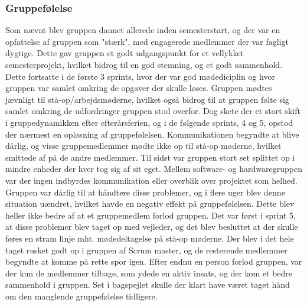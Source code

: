 \subsubsection{Gruppefølelse}
Som nævnt blev gruppen dannet allerede inden semesterstart, og der var en opfattelse af gruppen som "stærk", med engagerede medlemmer der var fagligt dygtige. 
Dette gav gruppen et godt udgangspunkt for et vellykket semesterprojekt, hvilket bidrog til en god stemning, og et godt sammenhold. Dette fortsatte i de første
 3 sprints, hvor der var god mødediciplin og hvor gruppen var samlet omkring de opgaver der skulle løses. Gruppen mødtes jævnligt til stå-op/arbejdsmøderne, 
 hvilket også bidrog til at gruppen følte sig samlet omkring de udfordringer gruppen stod overfor. Dog skete 
der et 
stort skift i gruppedynamikken efter efterårsferien, og i de følgende sprints, 4 og 5, opstod der nærmest en opløsning af gruppefølelsen. Kommunikationen 
begyndte at blive dårlig, og visse gruppemedlemmer mødte ikke op til stå-op møderne, hvilket smittede af på de andre medlemmer. Til sidst var gruppen stort 
set splittet op i mindre enheder der hver tog sig af sit eget. Mellem software- og hardwaregruppen var der ingen 
indbyrdes kommunikation eller overblik over projektet som helhed. Gruppen var dårlig til at håndtere disse problemer, og i flere uger blev denne situation 
uændret, hvilket havde en negativ effekt på gruppefølelsen. Dette blev heller ikke bedre af at et gruppemedlem forlod gruppen. Det var først i sprint 5, at 
disse problemer blev taget op med vejleder, og det blev besluttet at der skulle føres en stram linje mht. mødedeltagelse på stå-op møderne. Der blev i det 
hele taget rusket godt op i gruppen af Scrum master, og de resterende medlemmer begyndte at komme på rette spor igen. Efter endnu en person forlod gruppen,
var der kun de medlemmer tilbage, som ydede en aktiv insats, og der kom et bedre sammenhold i gruppen. Set i bagspejlet skulle der klart have 
været taget hånd om den manglende gruppefølelse tidligere. 

